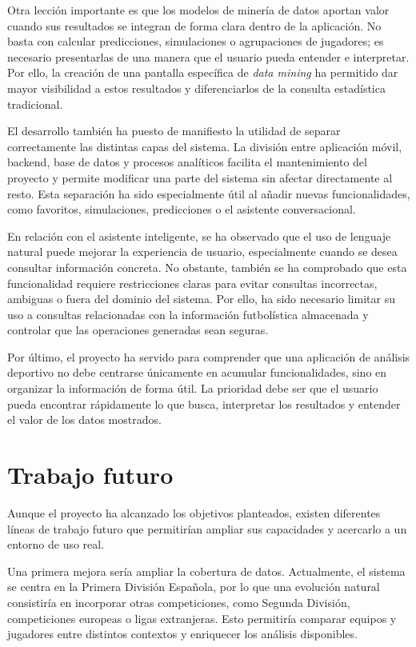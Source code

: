Otra lección importante es que los modelos de minería de datos aportan valor cuando sus resultados se integran de forma clara dentro de la aplicación. No basta con calcular predicciones, simulaciones o agrupaciones de jugadores; es necesario presentarlas de una manera que el usuario pueda entender e interpretar. Por ello, la creación de una pantalla específica de \textit{data mining} ha permitido dar mayor visibilidad a estos resultados y diferenciarlos de la consulta estadística tradicional.

El desarrollo también ha puesto de manifiesto la utilidad de separar correctamente las distintas capas del sistema. La división entre aplicación móvil, backend, base de datos y procesos analíticos facilita el mantenimiento del proyecto y permite modificar una parte del sistema sin afectar directamente al resto. Esta separación ha sido especialmente útil al añadir nuevas funcionalidades, como favoritos, simulaciones, predicciones o el asistente conversacional.

En relación con el asistente inteligente, se ha observado que el uso de lenguaje natural puede mejorar la experiencia de usuario, especialmente cuando se desea consultar información concreta. No obstante, también se ha comprobado que esta funcionalidad requiere restricciones claras para evitar consultas incorrectas, ambiguas o fuera del dominio del sistema. Por ello, ha sido necesario limitar su uso a consultas relacionadas con la información futbolística almacenada y controlar que las operaciones generadas sean seguras.

Por último, el proyecto ha servido para comprender que una aplicación de análisis deportivo no debe centrarse únicamente en acumular funcionalidades, sino en organizar la información de forma útil. La prioridad debe ser que el usuario pueda encontrar rápidamente lo que busca, interpretar los resultados y entender el valor de los datos mostrados.

\section{Trabajo futuro}

Aunque el proyecto ha alcanzado los objetivos planteados, existen diferentes líneas de trabajo futuro que permitirían ampliar sus capacidades y acercarlo a un entorno de uso real.

Una primera mejora sería ampliar la cobertura de datos. Actualmente, el sistema se centra en la Primera División Española, por lo que una evolución natural consistiría en incorporar otras competiciones, como Segunda División, competiciones europeas o ligas extranjeras. Esto permitiría comparar equipos y jugadores entre distintos contextos y enriquecer los análisis disponibles.

